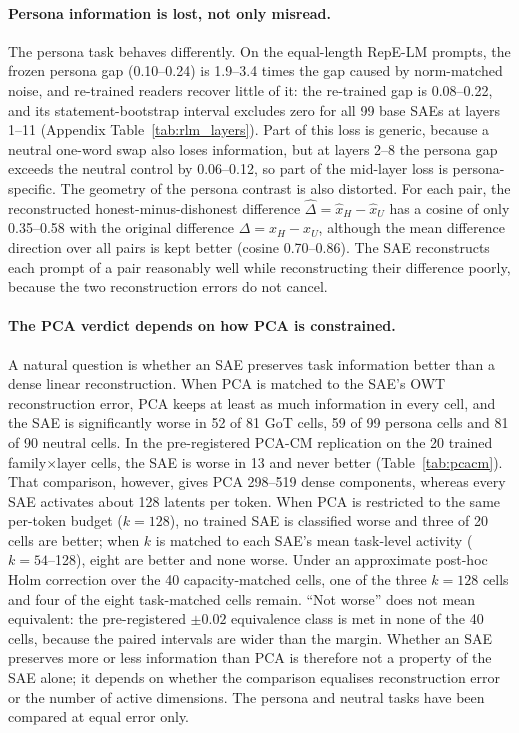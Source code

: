 \paragraph{Persona information is lost, not only misread.} The persona task behaves differently. On the
equal-length RepE-LM prompts, the frozen persona gap (0.10--0.24) is 1.9--3.4 times the gap caused by norm-matched
noise, and re-trained readers recover little of it: the re-trained gap is 0.08--0.22, and its statement-bootstrap
interval excludes zero for all 99 base SAEs at layers 1--11 (Appendix Table~\ref{tab:rlm_layers}). Part of this loss
is generic, because a neutral one-word swap also loses information, but at layers 2--8 the persona gap exceeds the
neutral control by 0.06--0.12, so part of the mid-layer loss is persona-specific. The geometry of the persona contrast
is also distorted. For each pair, the reconstructed honest-minus-dishonest difference
$\hat\Delta=\hat{x}_H-\hat{x}_U$ has a cosine of only 0.35--0.58 with the original difference $\Delta=x_H-x_U$, although
the mean difference direction over all pairs is kept better (cosine 0.70--0.86). The SAE reconstructs each prompt of
a pair reasonably well while reconstructing their difference poorly, because the two reconstruction errors do not
cancel.

\paragraph{The PCA verdict depends on how PCA is constrained.} A natural question is whether an SAE preserves task
information better than a dense linear reconstruction. When PCA is matched to the SAE's OWT reconstruction error, PCA
keeps at least as much information in every cell, and the SAE is significantly worse in 52 of 81 GoT cells, 59 of 99
persona cells and 81 of 90 neutral cells. In the pre-registered PCA-CM replication on the 20 trained family$\times$layer
cells, the SAE is worse in 13 and never better (Table~\ref{tab:pcacm}). That comparison, however, gives PCA 298--519
dense components, whereas every SAE activates about 128 latents per token. When PCA is restricted to the same
per-token budget ($k=128$), no trained SAE is classified worse and three of 20 cells are better; when $k$ is matched to
each SAE's mean task-level activity ($k=54$--128), eight are better and none worse. Under an approximate post-hoc Holm
correction over the 40 capacity-matched cells, one of the three $k=128$ cells and four of the eight task-matched cells
remain. ``Not worse'' does not mean equivalent: the pre-registered $\pm0.02$ equivalence class is met in none of the
40 cells, because the paired intervals are wider than the margin. Whether an SAE preserves more or less information
than PCA is therefore not a property of the SAE alone; it depends on whether the comparison equalises reconstruction
error or the number of active dimensions. The persona and neutral tasks have been compared at equal error only.


